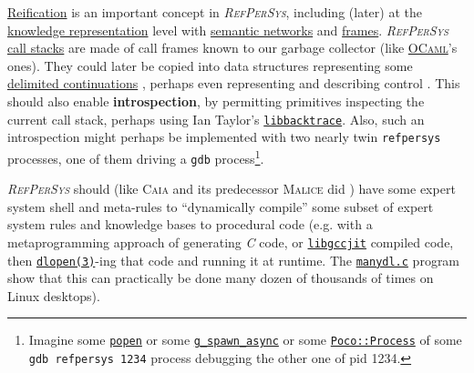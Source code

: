 \documentclass[11pt,a4paper,svgnames]{article}
\newcommand{\RefPerSys}{{\textit{\textsc{RefPerSys}}}}
\begin{document}
\href{https://en.wikipedia.org/wiki/Reification_(computer_science)}{Reification}
is an important concept in \RefPerSys, including (later) at the
\href{https://en.wikipedia.org/wiki/Knowledge_representation_and_reasoning}{knowledge
  representation} level with
\href{https://en.wikipedia.org/wiki/Semantic_network}{semantic
  networks} and
\href{https://en.wikipedia.org/wiki/Frame_(artificial_intelligence)}{frames}. {\RefPerSys}
\href{https://en.wikipedia.org/wiki/Call_stack}{call stacks} are made
of call frames known to our garbage collector (like
\href{https://caml.inria.fr/pub/docs/manual-ocaml/intfc.html}{\textsc{OCaml}}'s
ones). They could later be copied into data structures representing
some
\href{https://en.wikipedia.org/wiki/Delimited_continuation}{delimited
  continuations} \cite{Reynolds:1993:continuations,
  Queinnec:2004:ContinWeb}, perhaps even representing and describing
control \cite{fouet-starynkevitch:describing-control:1987,
  Starynkevitch-1990-EUM, Pitrat:2009:ArtifBeings}. This should also
enable \textbf{introspection}, by permitting primitives inspecting the
current call stack, perhaps using Ian Taylor's
\href{https://github.com/ianlancetaylor/libbacktrace}{\texttt{libbacktrace}}. Also,
such an introspection might perhaps be implemented \cite{mitchell:2001:alp} with two nearly
twin \texttt{refpersys} processes, one of them driving a \texttt{gdb}
process\footnote{Imagine some
\href{http://man7.org/linux/man-pages/man3/popen.3.html}{\texttt{popen}}
or some
\href{https://developer.gnome.org/glib/stable/glib-Spawning-Processes.html\#g-spawn-async}{\texttt{g\_spawn\_async}}
or some
\href{https://pocoproject.org/docs/Poco.Process.html}{\texttt{Poco::Process}}
of some \texttt{gdb refpersys 1234} process debugging the other one of
pid 1234.}.


{\RefPerSys} should (like \textsc{Caia} and its predecessor
\textsc{Malice} did
\cite{Pitrat:2009:AST,Pitrat:1996:FGCS,Pitrat:2009:ArtifBeings}) have
some expert system shell \cite{kumar:2015:importance-expert-systems,
  nigro:2008:meta} and meta-rules to ``dynamically compile'' some
subset of expert system rules and knowledge bases to procedural code
(e.g. with a metaprogramming approach of generating \emph{C} code, or
\href{https://gcc.gnu.org/onlinedocs/jit/}{\texttt{libgccjit}}
compiled code, then
\href{http://man7.org/linux/man-pages/man3/dlopen.3.html}{\texttt{dlopen(3)}}-ing
that code and running it at runtime. The
\href{https://github.com/bstarynk/misc-basile/blob/master/manydl.c}{\texttt{manydl.c}}
program show that this can practically be done many dozen of thousands
of times on Linux desktops).
\end{document}
